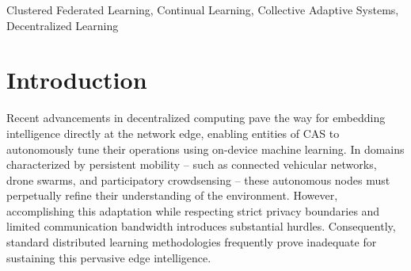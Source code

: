 \documentclass[conference]{IEEEtran}
\theoremstyle{plain}
\theoremstyle{definition}
\begin{document}
\begin{abstract}
\ac{CAS} increasingly rely on machine learning to let each node learn from locally sensed data, 
aligning its behavior with the surrounding environment. 
Scaling this intelligence, however, 
 raises fundamental challenges: 
 sensed data is often privacy-sensitive, preventing centralized collection; 
 nodes are mobile, traversing regions where nearby nodes perceive similar phenomena while distant ones observe radically different conditions,  creating natural spatial clusters; 
 and these distributions evolve over time due to mobility, 
 introducing temporal drift that makes local models progressively stale.
%
These dynamics arise across domains -- 
 vehicular sensing, drone-based monitoring, smartphone crowdsensing -- 
 yet the interplay of privacy, spatial heterogeneity, 
 and temporal drift severely undermines conventional learning strategies.
%
Therefore, we propose \approach{}, 
 a fully distributed \ac{FL} approach where nodes self-organize into learning groups through spatial clustering, 
 reflecting the geographic structure of the environment.
To counteract temporal drift, 
 each node combines experience replay with a dwell-time-aware adaptive averaging step,
 progressively incorporating the regional consensus as it remains longer within the same area,
 while preserving previously acquired knowledge under evolving distributions. 
% 
We evaluate our approach on synthetic experiments that systematically reproduce spatial and temporal shifts, 
 showing that standard federated strategies degrade significantly under these conditions 
 and that our method restores robust collective adaptation.
\end{abstract}

\begin{IEEEkeywords}
Clustered Federated Learning, Continual Learning, Collective Adaptive Systems, Decentralized Learning
\end{IEEEkeywords}

\section{Introduction}\label{sec:intro}
Recent advancements in decentralized computing pave the way for embedding intelligence directly at the network edge,
 enabling entities of \acf{CAS} to autonomously tune their operations using on-device machine learning. 
In domains characterized by persistent mobility -- 
 such as connected vehicular networks, 
 drone swarms, 
 and participatory crowdsensing -- 
 these autonomous nodes must perpetually refine their understanding of the environment.
% 
However, 
 accomplishing this adaptation while respecting strict privacy boundaries and limited communication bandwidth introduces substantial hurdles. 
 Consequently, standard distributed learning methodologies frequently prove inadequate for sustaining this pervasive edge intelligence.
\end{document}
